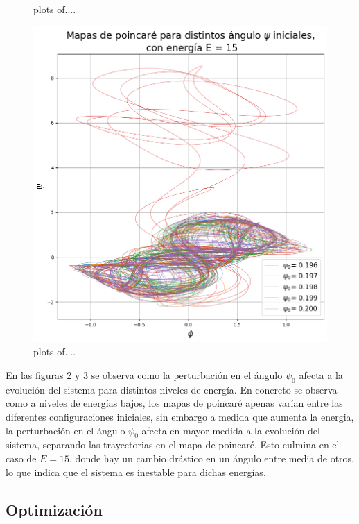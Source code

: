 \documentclass[11pt, twoside]{article} %
\begin{document}
\begin{figure}
\begin{subfigure}{.5\textwidth}
        \label{fig:poincare_estabilidad_E_10}
      \end{subfigure}
    \caption{plots of....}
    \label{fig:poincare_estabilidad_E}
\end{figure}
    
\begin{figure}[h!]
    \centering
    \includegraphics[width=0.8\linewidth]{plots/poincare_estabilidad_E_15.png}
    \caption{plots of....}
    \label{fig:poincare_estabilidad_E_15}
\end{figure}

En las figuras \ref{fig:poincare_estabilidad_E} y \ref{fig:poincare_estabilidad_E_15} 
se observa como la perturbación en el ángulo $\psi_0$ afecta a la evolución 
del sistema para distintos niveles de energía. En concreto se observa como 
a niveles de energías bajos, los mapas de poincaré apenas varían entre las
diferentes configuraciones iniciales, sin embargo a medida que aumenta la
energia, la perturbación en el ángulo $\psi_0$ afecta en mayor medida a la
evolución del sistema, separando las trayectorias en el mapa de poincaré. 
Esto culmina en el caso de $E = 15$, donde hay un cambio drástico en un ángulo
entre media de otros, lo que indica que el sistema es inestable para dichas 
energías.



\subsection{Optimización}
\end{document}
